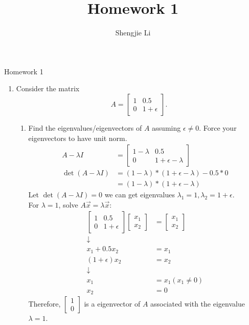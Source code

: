 \documentclass[letter, 11pt]{article}
\author{Shengjie Li}
\title{Homework 1}
\begin{document}
	\centerline{Homework 1}
	\begin{enumerate}[wide = 0pt, label = \textbf{Problem \arabic*:}]
		\item {Consider the matrix \[ A = \begin{bmatrix}
			1 & 0.5 \\
			0 & 1 + \epsilon
			\end{bmatrix}. \]} 
		\begin{enumerate}
			\item {Find the eigenvalues/eigenvectors of $ A $ assuming $ \epsilon \ne 0 $. Force your eigenvectors to have unit norm.} 
			\begin{align*}
				A - \lambda I &= \begin{bmatrix}
								1 - \lambda & 0.5 \\
								0 & 1 + \epsilon - \lambda
								\end{bmatrix} \\
				\det(A - \lambda I) &= (1 - \lambda) * (1 + \epsilon - \lambda) - 0.5 * 0 \\
				&= (1 - \lambda) * (1 + \epsilon - \lambda)
			\end{align*}
			Let $ \det(A - \lambda I) = 0 $ we can get eigenvalues $ \lambda_1 = 1, \lambda_2 = 1 + \epsilon $. \\
			For $ \lambda = 1 $, solve $ A \vec{x} = \lambda \vec{x} $: 
			\begin{align*}
				\begin{bmatrix}
				1 & 0.5 \\
				0 & 1 + \epsilon
				\end{bmatrix}
				\begin{bmatrix}
				x_1 \\ x_2
				\end{bmatrix}
				&= 
				\begin{bmatrix}
				x_1 \\ x_2
				\end{bmatrix}
				\\ \downarrow \\
				x_1 + 0.5x_2 &= x_1 \\
				(1 + \epsilon) x_2 &= x_2 
				\\ \downarrow \\
				x_1 &= x_1 (x_1 \ne 0)\\
				x_2 &= 0
			\end{align*}
			Therefore, $ \begin{bmatrix} 1 \\ 0 \end{bmatrix} $ is a eigenvector of $ A $ associated with the eigenvalue $ \lambda = 1 $. 

\end{enumerate}
\end{enumerate}
\end{document}
